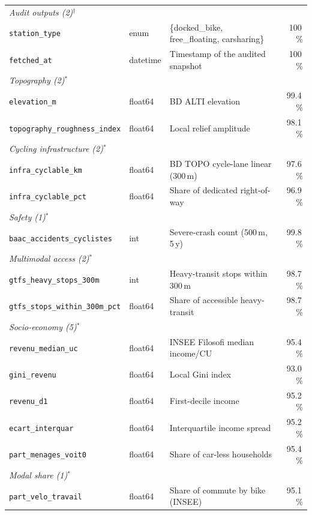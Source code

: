 \documentclass[11pt,a4paper]{article}
\begin{document}
\begin{table}[ht]
\begin{tabular}{@{}lllr@{}}
\midrule
\multicolumn{4}{l}{\textit{Audit outputs (2)$^\dag$}}\\
\quad\texttt{station\_type}        & enum    & \{docked\_bike, free\_floating, carsharing\} & 100\,\%\\
\quad\texttt{fetched\_at}          & datetime& Timestamp of the audited snapshot          & 100\,\%\\
\midrule
\multicolumn{4}{l}{\textit{Topography (2)$^\ast$}}\\
\quad\texttt{elevation\_m}                  & float64 & BD ALTI elevation                & 99.4\,\%\\
\quad\texttt{topography\_roughness\_index}  & float64 & Local relief amplitude           & 98.1\,\%\\
\midrule
\multicolumn{4}{l}{\textit{Cycling infrastructure (2)$^\ast$}}\\
\quad\texttt{infra\_cyclable\_km}           & float64 & BD TOPO cycle-lane linear (300\,m) & 97.6\,\%\\
\quad\texttt{infra\_cyclable\_pct}          & float64 & Share of dedicated right-of-way  & 96.9\,\%\\
\midrule
\multicolumn{4}{l}{\textit{Safety (1)$^\ast$}}\\
\quad\texttt{baac\_accidents\_cyclistes}    & int     & Severe-crash count (500\,m, 5\,y)  & 99.8\,\%\\
\midrule
\multicolumn{4}{l}{\textit{Multimodal access (2)$^\ast$}}\\
\quad\texttt{gtfs\_heavy\_stops\_300m}      & int     & Heavy-transit stops within 300\,m   & 98.7\,\%\\
\quad\texttt{gtfs\_stops\_within\_300m\_pct}& float64 & Share of accessible heavy-transit  & 98.7\,\%\\
\midrule
\multicolumn{4}{l}{\textit{Socio-economy (5)$^\ast$}}\\
\quad\texttt{revenu\_median\_uc}            & float64 & INSEE Filosofi median income/CU     & 95.4\,\%\\
\quad\texttt{gini\_revenu}                  & float64 & Local Gini index                    & 93.0\,\%\\
\quad\texttt{revenu\_d1}                    & float64 & First-decile income                 & 95.2\,\%\\
\quad\texttt{ecart\_interquar}              & float64 & Interquartile income spread         & 95.2\,\%\\
\quad\texttt{part\_menages\_voit0}          & float64 & Share of car-less households        & 95.4\,\%\\
\midrule
\multicolumn{4}{l}{\textit{Modal share (1)$^\ast$}}\\
\quad\texttt{part\_velo\_travail}           & float64 & Share of commute by bike (INSEE)    & 95.1\,\%\\
\bottomrule
\end{tabular}
\end{table}
\end{document}
